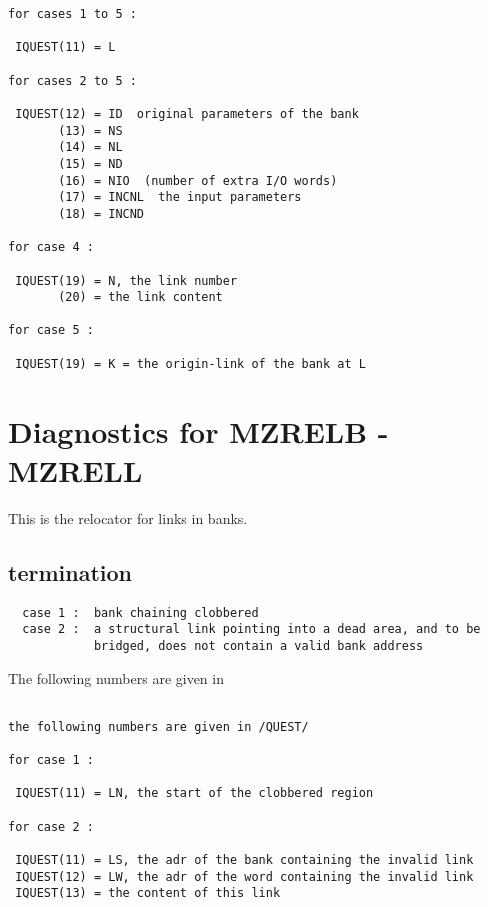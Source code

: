 \begin{verbatim}
for cases 1 to 5 :

 IQUEST(11) = L

for cases 2 to 5 :

 IQUEST(12) = ID  original parameters of the bank
       (13) = NS
       (14) = NL
       (15) = ND
       (16) = NIO  (number of extra I/O words)
       (17) = INCNL  the input parameters
       (18) = INCND

for case 4 :

 IQUEST(19) = N, the link number
       (20) = the link content

for case 5 :

 IQUEST(19) = K = the origin-link of the bank at L
\end{verbatim}

\section{Diagnostics for MZRELB - MZRELL}


This is the relocator for links in banks.

\subsection*{ termination}

\begin{verbatim}
  case 1 :  bank chaining clobbered
  case 2 :  a structural link pointing into a dead area, and to be
            bridged, does not contain a valid bank address
\end{verbatim}

The following numbers are given in 

\begin{verbatim}

the following numbers are given in /QUEST/

for case 1 :

 IQUEST(11) = LN, the start of the clobbered region

for case 2 :

 IQUEST(11) = LS, the adr of the bank containing the invalid link
 IQUEST(12) = LW, the adr of the word containing the invalid link
 IQUEST(13) = the content of this link

\end{verbatim}

